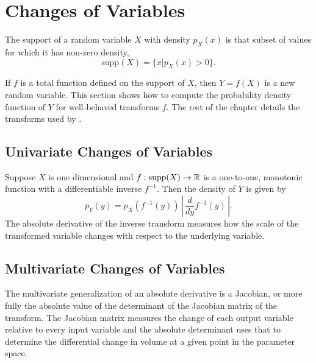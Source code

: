 \section{Changes of Variables}\label{change-of-variables.section}

The support of a random variable $X$ with density $p_X(x)$ is that
subset of values for which it has non-zero density,
%
\[
\mbox{supp}(X) = \{ x | p_X(x) > 0 \}.
\]

If $f$ is a total function defined on the support of $X$, then $Y =
f(X)$ is a new random variable.  This section shows how to compute the
probability density function of $Y$ for well-behaved transforms $f$.
The rest of the chapter details the transforms used by \Stan.



\subsection{Univariate Changes of Variables}

Suppose $X$ is one dimensional and $f: \mbox{supp}(X) \rightarrow
\reals$ is a one-to-one, monotonic function with a differentiable
inverse $f^{-1}$.  Then the density of $Y$ is given by
%
\[
p_Y(y) = p_X(f^{-1}(y))  
         \,
         \left| \, \frac{d}{dy} f^{-1}(y)\, \right|.
\]
The absolute derivative of the inverse transform measures how the
scale of the transformed variable changes with respect to the
underlying variable.


\subsection{Multivariate Changes of Variables}

The multivariate generalization of an absolute derivative is a
Jacobian, or more fully the absolute value of the determinant of the
Jacobian matrix of the transform.  The Jacobian matrix measures the change of
each output variable relative to every input variable and the absolute
determinant uses that to determine the differential change in volume
at a given point in the parameter space.


